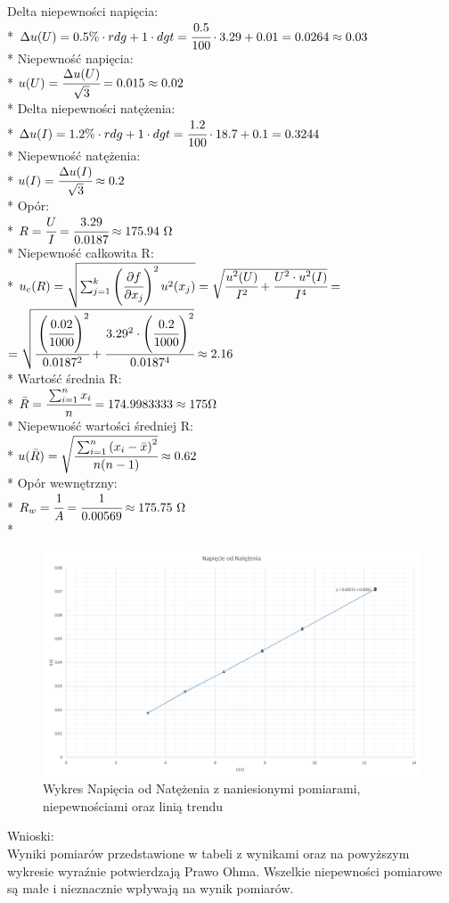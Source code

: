 \documentclass{article}
\begin{document}
\begin{center}
    Delta niepewności napięcia:\\*
    $\Delta u(U)  = 0.5\% \cdot rdg+1 \cdot dgt=\cfrac{0.5}{100} \cdot 3.29 + 0.01=0.0264\approx0.03$\\*
    Niepewność napięcia:\\*
    $u(U)=\cfrac{\Delta u(U)}{\sqrt{3}}=0.015\approx0.02$\\*
    Delta niepewności natężenia:\\* 
    $\Delta u(I) = 1.2\% \cdot rdg+1 \cdot dgt = \cfrac{1.2}{100} \cdot 18.7 +0.1 =0.3244$\\*
    Niepewność natężenia:\\*
    $u(I)= \cfrac{\Delta u(I)}{\sqrt{3}} \approx 0.2$\\*
    Opór:\\* 
    $R=\cfrac{U}{I} = \cfrac{3.29}{0.0187} \approx 175.94 \ \Omega$\\*
    Niepewność całkowita R:\\*
    $u_c (R)=\sqrt{\sum_{j=1}^{k}\left( \cfrac{\partial f}{\partial x_j}\right)^2 u^2 (x_j)}
    =\sqrt{\cfrac{u^2 (U)}{I^2} + \cfrac{U^2 \cdot u^2 (I)}{I^4}}=$
    $= \sqrt{\cfrac{\left(\cfrac{0.02}{1000}\right)^2}{0.0187^2} + \cfrac{3.29^2 \cdot \left(\cfrac{0.2}{1000}\right)^2}{0.0187^4}}\approx 2.16$\\* 
    Wartość średnia R:\\* 
    $\bar{R} = \cfrac{\sum_{i=1}^{n}x_i}{n}=174.9983333 \approx 175\Omega$\\*
    Niepewność wartości średniej R:\\ *
    $u(\bar{R}) = \sqrt{\cfrac{\sum_{i=1}^{n} \left(x_i - \bar{x} \right)^2}{n(n-1)}}\approx 0.62$\\*
    Opór wewnętrzny:\\* 
    $R_w =\cfrac{1}{A}=\cfrac{1}{0.00569} \approx 175.75 \ \Omega$\\*

\end{center}
\newpage
\begin{figure}[h]
    \centering
    \includegraphics[width=\textwidth]{graph2.png}
    \caption{Wykres Napięcia od Natężenia z naniesionymi pomiarami, niepewnościami
     oraz linią trendu}
    \label{fig:mesh1}
\end{figure}
Wnioski:\\
Wyniki pomiarów przedstawione w tabeli z wynikami oraz na powyższym wykresie 
wyraźnie potwierdzają Prawo Ohma. Wszelkie niepewności pomiarowe są małe i 
nieznacznie wpływają na wynik pomiarów. 
\end{document}
